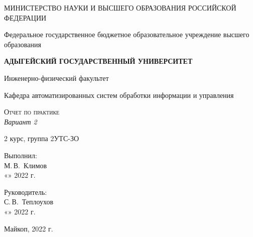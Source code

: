 \documentclass[12pt,a4paper]{scrartcl}
\begin{document}
	\begin{titlepage}
		\begin{center}
			\large
			МИНИСТЕРСТВО НАУКИ И ВЫСШЕГО ОБРАЗОВАНИЯ РОССИЙСКОЙ ФЕДЕРАЦИИ
			
			Федеральное государственное бюджетное образовательное учреждение высшего образования
			
			\textbf{АДЫГЕЙСКИЙ ГОСУДАРСТВЕННЫЙ УНИВЕРСИТЕТ}
			\vspace{0.25cm}
			
			Инженерно-физический факультет
			
			Кафедра автоматизированных систем обработки информации и управления
			\vfill
			
			\vfill
			
			\textsc{Отчет по практике}\\[5mm]
			
			{\LARGE \textit{Вариант 2}}
			\bigskip
			
			2 курс, группа 2УТС-ЗО
		\end{center}
		\vfill
		
		\newlength{\ML}
		\hfill\begin{minipage}{0.5\textwidth}
			Выполнил:\\
			\underline{\hspace{\ML}} М.\,В.~Климов\\
			«\underline{\hspace{0.7cm}}» \underline{\hspace{2cm}} 2022 г.
		\end{minipage}%
		\bigskip
		
		\hfill\begin{minipage}{0.5\textwidth}
			Руководитель:\\
			\underline{\hspace{\ML}} С.\,В.~Теплоухов\\
			«\underline{\hspace{0.7cm}}» \underline{\hspace{2cm}} 2022 г.
		\end{minipage}%
		\vfill
		
		\begin{center}
			Майкоп, 2022 г.
		\end{center}
	\end{titlepage}
\end{document}
